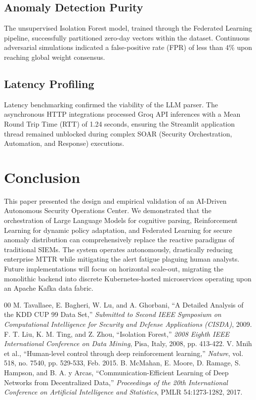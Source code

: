 \documentclass[conference]{IEEEtran}
\begin{document}
\subsection{Anomaly Detection Purity}
The unsupervised Isolation Forest model, trained through the Federated Learning pipeline, successfully partitioned zero-day vectors within the dataset. Continuous adversarial simulations indicated a false-positive rate (FPR) of less than 4\% upon reaching global weight consensus.

\subsection{Latency Profiling}
Latency benchmarking confirmed the viability of the LLM parser. The asynchronous HTTP integrations processed Groq API inferences with a Mean Round Trip Time (RTT) of 1.24 seconds, ensuring the Streamlit application thread remained unblocked during complex SOAR (Security Orchestration, Automation, and Response) executions.

\section{Conclusion}
This paper presented the design and empirical validation of an AI-Driven Autonomous Security Operations Center. We demonstrated that the orchestration of Large Language Models for cognitive parsing, Reinforcement Learning for dynamic policy adaptation, and Federated Learning for secure anomaly distribution can comprehensively replace the reactive paradigms of traditional SIEMs. The system operates autonomously, drastically reducing enterprise MTTR while mitigating the alert fatigue plaguing human analysts. Future implementations will focus on horizontal scale-out, migrating the monolithic backend into discrete Kubernetes-hosted microservices operating upon an Apache Kafka data fabric.

\begin{thebibliography}{00}
 M. Tavallaee, E. Bagheri, W. Lu, and A. Ghorbani, ``A Detailed Analysis of the KDD CUP 99 Data Set,'' \textit{Submitted to Second IEEE Symposium on Computational Intelligence for Security and Defense Applications (CISDA)}, 2009.
 F. T. Liu, K. M. Ting, and Z. Zhou, ``Isolation Forest,'' \textit{2008 Eighth IEEE International Conference on Data Mining}, Pisa, Italy, 2008, pp. 413-422.
 V. Mnih et al., ``Human-level control through deep reinforcement learning,'' \textit{Nature}, vol. 518, no. 7540, pp. 529-533, Feb. 2015.
 B. McMahan, E. Moore, D. Ramage, S. Hampson, and B. A. y Arcas, ``Communication-Efficient Learning of Deep Networks from Decentralized Data,'' \textit{Proceedings of the 20th International Conference on Artificial Intelligence and Statistics}, PMLR 54:1273-1282, 2017.
\end{thebibliography}
\end{document}
